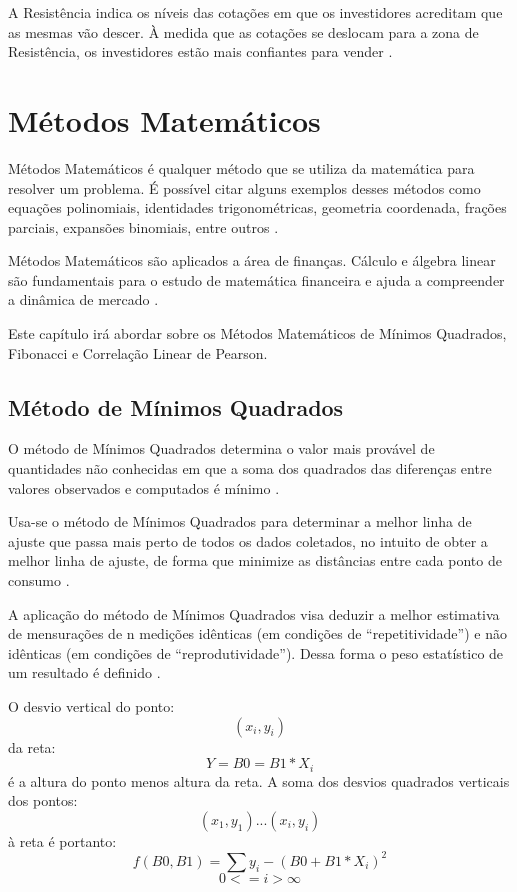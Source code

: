 A Resistência indica os níveis das cotações em que os investidores acreditam que as mesmas vão descer. À medida que as cotações se deslocam para a zona de Resistência, os investidores estão mais confiantes para vender \cite{collins2012}.

\section{Métodos Matemáticos}

Métodos Matemáticos é qualquer método que se utiliza da matemática para resolver um problema. É possível citar alguns exemplos desses métodos como equações polinomiais, identidades trigonométricas, geometria coordenada, frações parciais, expansões binomiais, entre outros \cite{riley2011}.

Métodos Matemáticos são aplicados a área de finanças. Cálculo e álgebra linear são fundamentais para o estudo de matemática financeira e ajuda a compreender a dinâmica de mercado \cite{konis2014}.

Este capítulo irá abordar sobre os Métodos Matemáticos de Mínimos Quadrados, Fibonacci e Correlação Linear de Pearson.

\subsection{Método de Mínimos Quadrados}

O método de Mínimos Quadrados determina o valor mais provável de quantidades não conhecidas em que a soma dos quadrados das diferenças entre valores observados e computados é mínimo \cite[pág.~72]{inacio2010}.

Usa-se o método de Mínimos Quadrados para determinar a melhor linha de ajuste que passa mais perto de todos os dados coletados, no intuito de obter a melhor linha de ajuste, de forma que minimize as distâncias entre cada ponto de consumo \cite[pág.~46]{dias1985}.

A aplicação do método de Mínimos Quadrados visa deduzir a melhor estimativa de mensurações de n medições idênticas (em condições de “repetitividade”) e não idênticas (em condições de “reprodutividade”). Dessa forma o peso estatístico de um resultado é definido \cite[pág.~149]{vuolo1996}.

O desvio vertical do ponto:
\begin{equation}
(x_{i}, y_{i})
\end{equation}
da reta:
\begin{equation}
Y = B0 = B1*X_{i}
\end{equation}
é a altura do ponto menos altura da reta. A soma dos desvios quadrados verticais dos pontos:
\begin{equation}
(x_{1}, y_{1})...(x_{i}, y_{i})
\end{equation}
à reta é portanto:
\begin{equation}
f(B0,B1) = \sum{y_{i} - (B0 + B1 * X_{i})}^2
\end{equation}
\begin{equation}
0 <= i > \infty
\end{equation}

